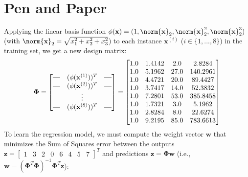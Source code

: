 \documentclass{exam}
\newcommand*{\horzbar}{\rule[.5ex]{2.5ex}{0.5pt}}
\begin{document}
    \section{Pen and Paper}
    \begin{questions}
        \item Applying the linear basis function $\phi(\textbf{x}) = (1, \norm{\textbf{x}}_2, \norm{\textbf{x}}_2^2, \norm{\textbf{x}}_2^3)$ (with $\norm{\textbf{x}}_2 = \sqrt{x_1^2 + x_2^2 + x_3^2}$) to each instance $\textbf{x}^{(i)}$ ($i \in \{1, ..., 8\}$) in the training set, we get a new design matrix:
        \begin{equation*}
            \boldsymbol{\Phi} = 
            \begin{bmatrix}
                \horzbar & (\phi(\textbf{x}^{(1)}))^T & \horzbar \\
                \horzbar & (\phi(\textbf{x}^{(2)}))^T & \horzbar \\
                         & \vdots    &                     \\
                \horzbar & (\phi(\textbf{x}^{(8)}))^T & \horzbar \\
            \end{bmatrix} =
            \begin{bmatrix}
                1.0 & 1.4142 & 2.0 & 2.8284 \\
                1.0 & 5.1962 & 27.0 & 140.2961 \\
                1.0 & 4.4721 & 20.0 & 89.4427 \\
                1.0 & 3.7417 & 14.0 & 52.3832 \\
                1.0 & 7.2801 & 53.0 & 385.8458 \\
                1.0 & 1.7321 & 3.0 & 5.1962 \\
                1.0 & 2.8284 & 8.0 & 22.6274 \\
                1.0 & 9.2195 & 85.0 & 783.6613 \\
            \end{bmatrix}
        \end{equation*}
        To learn the regression model, we must compute the weight vector $\textbf{w}$ that minimizes the Sum of Squares error between the outputs $\textbf{z} = 
            \begin{bmatrix}
                1 & 3 & 2 & 0 & 6 & 4 & 5 & 7
            \end{bmatrix}^T$ and predictions $\textbf{\^{z}} = \boldsymbol{\Phi} \textbf{w}$ (i.e., $\textbf{w} = (\boldsymbol{\Phi}^T\boldsymbol{\Phi})^{-1}\boldsymbol{\Phi}^T\textbf{z}$):

\end{questions}
\end{document}
